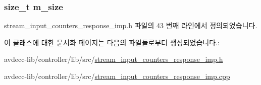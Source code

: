 \subsubsection[{\texorpdfstring{m\+\_\+size}{m_size}}]{\setlength{\rightskip}{0pt plus 5cm}size\+\_\+t m\+\_\+size\hspace{0.3cm}{\ttfamily [private]}}\hypertarget{classavdecc__lib_1_1stream__input__counters__response__imp_a0dc3c363255f193681c77b4d2a82e995}{}\label{classavdecc__lib_1_1stream__input__counters__response__imp_a0dc3c363255f193681c77b4d2a82e995}


stream\+\_\+input\+\_\+counters\+\_\+response\+\_\+imp.\+h 파일의 43 번째 라인에서 정의되었습니다.



이 클래스에 대한 문서화 페이지는 다음의 파일들로부터 생성되었습니다.\+:\begin{DoxyCompactItemize}
\item 
avdecc-\/lib/controller/lib/src/\hyperlink{stream__input__counters__response__imp_8h}{stream\+\_\+input\+\_\+counters\+\_\+response\+\_\+imp.\+h}\item 
avdecc-\/lib/controller/lib/src/\hyperlink{stream__input__counters__response__imp_8cpp}{stream\+\_\+input\+\_\+counters\+\_\+response\+\_\+imp.\+cpp}\end{DoxyCompactItemize}
